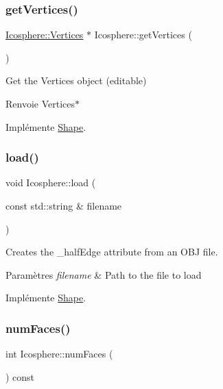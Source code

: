 \subsubsection{\texorpdfstring{get\+Vertices()}{getVertices()}}
{\footnotesize\ttfamily \hyperlink{struct_shape_1_1_vertices}{Icosphere\+::\+Vertices} $\ast$ Icosphere\+::get\+Vertices (\begin{DoxyParamCaption}{ }\end{DoxyParamCaption})\hspace{0.3cm}{\ttfamily [virtual]}}



Get the Vertices object (editable) 

\begin{DoxyReturn}{Renvoie}
Vertices$\ast$ 
\end{DoxyReturn}


Implémente \hyperlink{class_shape_a08ba4a861e979b8adffdbe615d048203}{Shape}.

\mbox{\label{class_icosphere_a1b20bf118a66f5202228a5a4522bd7fd}} 
\subsubsection{\texorpdfstring{load()}{load()}}
{\footnotesize\ttfamily void Icosphere\+::load (\begin{DoxyParamCaption}\item[{const std\+::string \&}]{filename }\end{DoxyParamCaption})\hspace{0.3cm}{\ttfamily [virtual]}}



Creates the \+\_\+half\+Edge attribute from an O\+BJ file. 


\begin{DoxyParams}{Paramètres}
{\em filename} & Path to the file to load \\
\hline
\end{DoxyParams}


Implémente \hyperlink{class_shape_a20d654ec232b682c36cd8b28d2cba750}{Shape}.

\mbox{\label{class_icosphere_a4bacbf52b66b1c6b3e80380a0bb4c9e5}} 
\subsubsection{\texorpdfstring{num\+Faces()}{numFaces()}}
{\footnotesize\ttfamily int Icosphere\+::num\+Faces (\begin{DoxyParamCaption}{ }\end{DoxyParamCaption}) const\hspace{0.3cm}{\ttfamily [inline]}}



